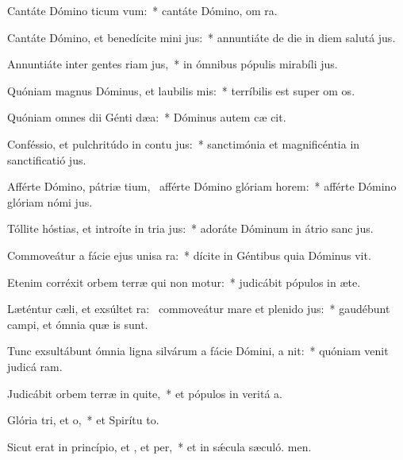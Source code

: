 \item Cantáte Dómino ticum vum:~* cantáte Dómino, om ra.
\item Cantáte Dómino, et benedícite mini jus:~* annuntiáte de die in diem salutá jus.
\item Annuntiáte inter gentes riam jus,~* in ómnibus pópulis mirabíli jus.
\item Quóniam magnus Dóminus, et laubilis mis:~* terríbilis est super om os.
\item Quóniam omnes dii Génti dæa:~* Dóminus autem cæ cit.
\item Conféssio, et pulchritúdo in contu jus:~* sanctimónia et magnificéntia in sanctificatió jus.
\item Afférte Dómino, pátriæ tium,~\pscross{} afférte Dómino glóriam  horem:~* afférte Dómino glóriam nómi jus.
\item Tóllite hóstias, et introíte in tria jus:~* adoráte Dóminum in átrio sanc jus.
\item Commoveátur a fácie ejus unisa ra:~* dícite in Géntibus quia Dóminus vit.
\item Etenim corréxit orbem terræ qui non motur:~* judicábit pópulos in æte.
\item Læténtur cæli, et exsúltet ra:~\pscross{} commoveátur mare et plenido jus:~* gaudébunt campi, et ómnia quæ  is sunt.
\item Tunc exsultábunt ómnia ligna silvárum a fácie Dómini, a nit:~* quóniam venit judicá ram.
\item Judicábit orbem terræ in quite,~* et pópulos in veritá a.
\item Glória tri, et o,~* et Spirítu to.
\item Sicut erat in princípio, et , et per,~* et in sǽcula sæculó. men.

